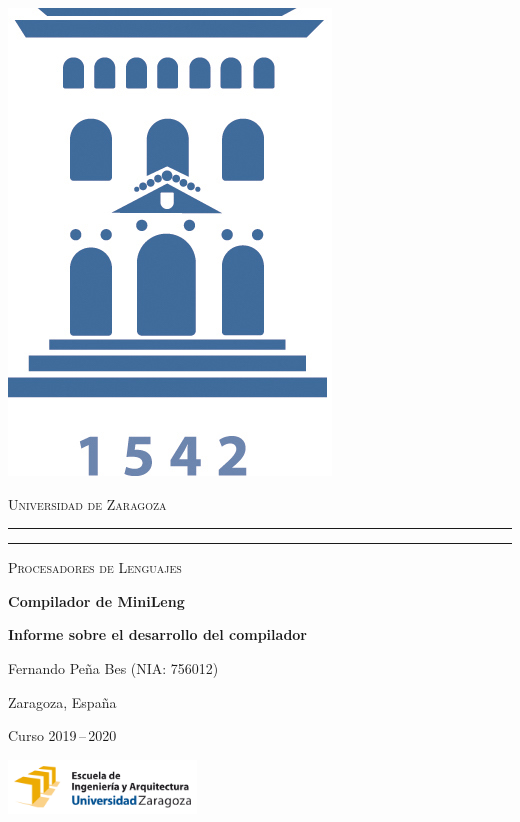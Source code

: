 \documentclass[a4paper,10pt]{article}
\begin{document}
\begin{titlepage}
    \centering
    \includegraphics[width=1 cm]{logoUZ.jpg}

    \textsc{\large Universidad de Zaragoza}
    \rule{\textwidth}{1.6pt}\vspace*{-\baselineskip}\vspace*{2pt} %
    \rule{\textwidth}{0.4pt} %

    \vfill

    {\LARGE \scshape Procesadores de Lenguajes}

    \vspace{2cm}

    {\bfseries \Huge Compilador de MiniLeng}

    \vspace{.5cm}

    {\bfseries \Large Informe sobre el desarrollo del compilador}

    \vspace{3cm}





    {\large Fernando Peña Bes (NIA: 756012)}

    \vfill

    \large{Zaragoza, España}

    {Curso 2019\,--\,2020}

    \vfill

    \includegraphics[width=5.0cm]{EINA.png}

\end{titlepage}




\tableofcontents

\pagebreak

\setcounter{page}{1}

\pagestyle{fancy}









\renewcommand\appendixname{Anexo}

\begin{appendices}

% 
\end{appendices}

\clearpage{}
\newpage
\nocite{*}
\printbibliography
\end{document}
